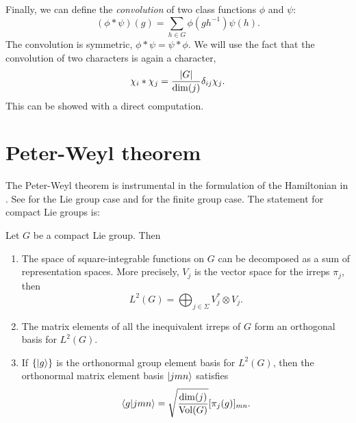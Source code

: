Finally, we can define the \emph{convolution} of two class functions $\phi$ and $\psi$:
\begin{equation}
    (\phi \ast \psi)(g) = \sum_{h \in G} \phi(g h^{-1}) \psi(h).
\end{equation}
The convolution is symmetric, $\phi \ast \psi = \psi \ast \phi$.
We will use the fact that the convolution of two characters is again a character,
\begin{equation}
    \chi_i \ast \chi_j = \frac{\abs{G}}{\dim(j)}  \delta_{ij} \chi_j.
\end{equation}
This can be showed with a direct computation.


\section{Peter-Weyl theorem}
\label{sec:peter_weyl_theorem}

The Peter-Weyl theorem is instrumental in the formulation of the Hamiltonian in .
See \citneeded for the Lie group case and \citneeded for the finite group case.
The statement for compact Lie groups is:

\begin{theorem}
    Let $G$ be a compact Lie group.
    Then
    \begin{enumerate}[label=(\roman*)]
        \item  The space of square-integrable functions on $G$ can be decomposed as a sum of representation spaces.
            More precisely, $V_{j}$ is the vector space for the irreps $\pi_j$, then
            \begin{equation}
                L^2(G) = \bigoplus_{j \in \Sigma} V_j^{\ast} \otimes V_j.
            \end{equation}

        \item The matrix elements of all the inequivalent irreps of $G$ form an orthogonal basis for $L^2(G)$.

        \item If $\{\ket{g}\}$ is the orthonormal group element basis for $L^2(G) $, then the orthonormal matrix element basis $\ket{jmn}$ satisfies
            \begin{equation}
                \braket{g}{jmn} =
                \sqrt{\frac{\dim(j)}{\mathrm{Vol}(G)}} [\pi_j(g)]_{mn}.
            \end{equation}
    \end{enumerate}
\end{theorem}

